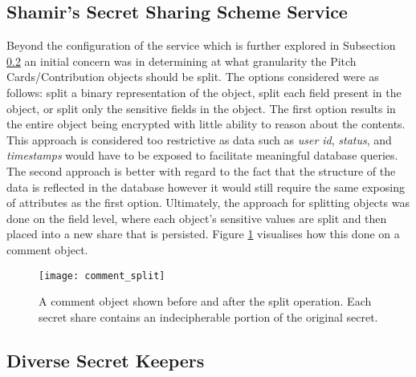 \subsection{Shamir's Secret Sharing Scheme Service}
Beyond the configuration of the service which is further explored in Subsection \ref{SS:diverse_secret_keepers} an initial concern was in determining at what granularity the Pitch Cards/Contribution objects should be split. The options considered were as follows: split a binary representation of the object, split each field present in the object, or split only the sensitive fields in the object. The first option results in the entire object being encrypted with little ability to reason about the contents. This approach is considered too restrictive as data such as \textit{user id}, \textit{status}, and \textit{timestamps} would have to be exposed to facilitate meaningful database queries. The second approach is better with regard to the fact that the structure of the data is reflected in the database however it would still require the same exposing of attributes as the first option. Ultimately, the approach for splitting objects was done on the field level, where each object's sensitive values are split and then placed into a new share that is persisted. Figure \ref{fig:comment_split} visualises how this done on a comment object. 

\begin{figure}[ht]
    \centering
    \texttt{[image: comment\_split]}
    \caption{A comment object shown before and after the split operation. Each secret share contains an indecipherable portion of the original secret.}
    \label{fig:comment_split}
\end{figure}

\subsection{Diverse Secret Keepers}\label{SS:diverse_secret_keepers}

